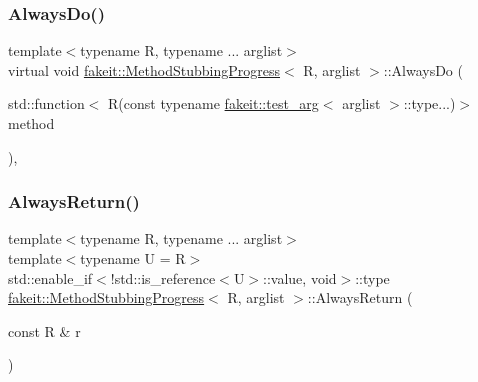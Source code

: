 \subsubsection{\texorpdfstring{AlwaysDo()}{AlwaysDo()}\hspace{0.1cm}{\footnotesize\ttfamily [9/9]}}
{\footnotesize\ttfamily template$<$typename R, typename ... arglist$>$ \\
virtual void \mbox{\hyperlink{structfakeit_1_1MethodStubbingProgress}{fakeit\+::\+Method\+Stubbing\+Progress}}$<$ R, arglist $>$\+::Always\+Do (\begin{DoxyParamCaption}\item[{std\+::function$<$ R(const typename \mbox{\hyperlink{structfakeit_1_1test__arg}{fakeit\+::test\+\_\+arg}}$<$ arglist $>$\+::type...)$>$}]{method }\end{DoxyParamCaption})\hspace{0.3cm}{\ttfamily [inline]}, {\ttfamily [virtual]}}

\mbox{\label{structfakeit_1_1MethodStubbingProgress_a268ca122b518c0a34e80535d8f457549}} 
\subsubsection{\texorpdfstring{AlwaysReturn()}{AlwaysReturn()}\hspace{0.1cm}{\footnotesize\ttfamily [1/27]}}
{\footnotesize\ttfamily template$<$typename R, typename ... arglist$>$ \\
template$<$typename U  = R$>$ \\
std\+::enable\+\_\+if$<$!std\+::is\+\_\+reference$<$U$>$\+::value, void$>$\+::type \mbox{\hyperlink{structfakeit_1_1MethodStubbingProgress}{fakeit\+::\+Method\+Stubbing\+Progress}}$<$ R, arglist $>$\+::Always\+Return (\begin{DoxyParamCaption}\item[{const R \&}]{r }\end{DoxyParamCaption})\hspace{0.3cm}{\ttfamily [inline]}}

\mbox{\label{structfakeit_1_1MethodStubbingProgress_a84cf6a4bf307cf8d49efb69b014e9b11}} 
